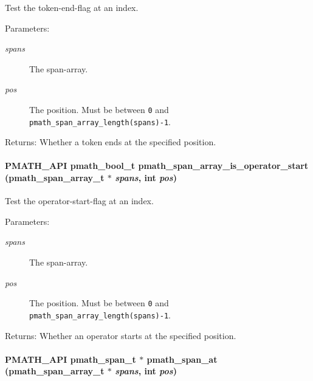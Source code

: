Test the token-end-flag at an index. 

\begin{Desc}
\item[Parameters:]
\begin{description}
\item[{\em spans}]The span-array. \item[{\em pos}]The position. Must be between {\tt 0} and {\tt pmath\_\-span\_\-array\_\-length(spans)-1}. \end{description}
\end{Desc}
\begin{Desc}
\item[Returns:]Whether a token ends at the specified position. \end{Desc}
\hypertarget{group__parser_g7ca9a7b13aef344ba903b33f07ba912a}{
\paragraph[{pmath\_\-span\_\-array\_\-is\_\-operator\_\-start}]{\setlength{\rightskip}{0pt plus 5cm}PMATH\_\-API {\bf pmath\_\-bool\_\-t} pmath\_\-span\_\-array\_\-is\_\-operator\_\-start ({\bf pmath\_\-span\_\-array\_\-t} $\ast$ {\em spans}, \/  int {\em pos})}\hfill}
\label{group__parser_g7ca9a7b13aef344ba903b33f07ba912a}


Test the operator-start-flag at an index. 

\begin{Desc}
\item[Parameters:]
\begin{description}
\item[{\em spans}]The span-array. \item[{\em pos}]The position. Must be between {\tt 0} and {\tt pmath\_\-span\_\-array\_\-length(spans)-1}. \end{description}
\end{Desc}
\begin{Desc}
\item[Returns:]Whether an operator starts at the specified position. \end{Desc}
\hypertarget{group__parser_g8f106cc9c1ae23635bbd759072505c27}{
\paragraph[{pmath\_\-span\_\-at}]{\setlength{\rightskip}{0pt plus 5cm}PMATH\_\-API {\bf pmath\_\-span\_\-t} $\ast$ pmath\_\-span\_\-at ({\bf pmath\_\-span\_\-array\_\-t} $\ast$ {\em spans}, \/  int {\em pos})}\hfill}
\label{group__parser_g8f106cc9c1ae23635bbd759072505c27}



